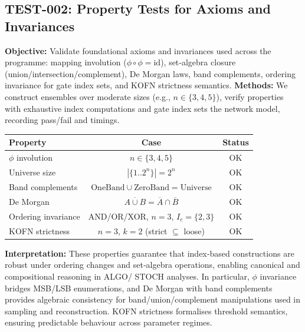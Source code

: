 \subsection{TEST-002: Property Tests for Axioms and Invariances}
\textbf{Objective:} Validate foundational axioms and invariances used across the programme: mapping involution ($\phi\circ\phi=\mathrm{id}$), set‑algebra closure (union/intersection/complement), De Morgan laws, band complements, ordering invariance for gate index sets, and KOFN strictness semantics.
\textbf{Methods:} We construct ensembles over moderate sizes (e.g., $n\in\{3,4,5\}$), verify properties with exhaustive index computations and gate index sets the network model, recording pass/fail and timings.
\begin{center}
\begin{tabular}{lcc}
\toprule
Property & Case & Status \\
\midrule
$\phi$ involution & $n\in\{3,4,5\}$ & OK \\
Universe size & $|\{1..2^n\}|=2^n$ & OK \\
Band complements & $\mathrm{OneBand}\cup\mathrm{ZeroBand}=\mathrm{Universe}$ & OK \\
De Morgan & $\overline{A\cup B}=\overline{A}\cap\overline{B}$ & OK \\
Ordering invariance & AND/OR/XOR, $n=3$, $I_c=\{2,3\}$ & OK \\
KOFN strictness & $n=3$, $k=2$ (strict $\subseteq$ loose) & OK \\
\bottomrule
\end{tabular}
\end{center}
\textbf{Interpretation:} These properties guarantee that index‑based constructions are robust under ordering changes and set‑algebra operations, enabling canonical and compositional reasoning in ALGO/ STOCH analyses. In particular, $\phi$ invariance bridges MSB/LSB enumerations, and De Morgan with band complements provides algebraic consistency for band/union/complement manipulations used in sampling and reconstruction. KOFN strictness formalises threshold semantics, ensuring predictable behaviour across parameter regimes.

